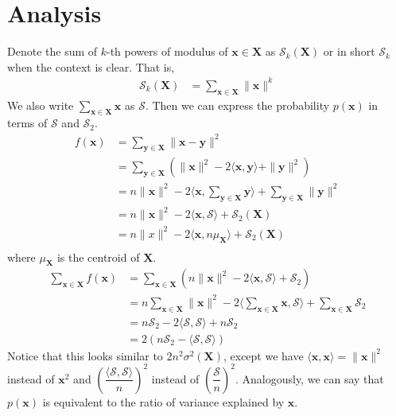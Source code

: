 \documentclass[twoside, 11pt]{article}
\newcommand{\x}{\mathbf{x}}
\newcommand{\X}{\mathbf{X}}
\newcommand{\y}{\mathbf{y}}
\renewcommand{\S}{\mathcal{S}}
\begin{document}
	\section{Analysis}
	Denote the sum of $k$-th powers of modulus of $\x\in\X$ as $\S_k(\X)$ or in short $\S_k$ when the context is clear. That is,
		\begin{align*}
			\S_k(\X) & = \sum_{\x\in\X}\|\x\|^k
		\end{align*}
	We also write $\sum_{\x\in\X}\x$ as $\S$. Then we can express the probability $p(\x)$ in terms of $\S$ and $\S_2$.
		\begin{align*}
			f(\x)	& = \sum_{\y\in\X}\|\x-\y\|^2\\
					& = \sum_{\y\in\X}\left(\|\x\|^2-2\langle\x,\y\rangle+\|\y\|^2\right)\\
					& = n\|\x\|^2-2\langle\x,\sum_{\y\in\X}\y\rangle+\sum_{\y\in\X}\|\y\|^2\\
					& = n\|\x\|^2-2\langle\x,\S\rangle+\S_2(\X)\\
					& = n\|x\|^2-2\langle\x,n\mu_{\X}\rangle+\S_2(\X)\\
		\end{align*}
	where $\mu_{\X}$ is the centroid of $\X$.
		\begin{align*}
			\sum_{\x\in\X}f(\x)
					& = \sum_{\x\in\X}\left(n\|\x\|^2-2\langle\x,\S\rangle+\S_2\right)\\
					& = n\sum_{\x\in\X}\|\x\|^2-2\langle\sum_{\x\in\X}\x,\S\rangle+\sum_{\x\in\X}\S_2\\
					& = n\S_2-2\langle\S,\S\rangle+n\S_2\\
					& = 2(n\S_2-\langle\S,\S\rangle)
		\end{align*}
	Notice that this looks similar to $2n^2\sigma^2(\X)$, except we have $\langle \x,\x\rangle=\|\x\|^2$ instead of $\x^2$ and $\left(\dfrac{\langle\S,\S\rangle}{n}\right)^2$ instead of $\left(\dfrac{\S}{n}\right)^2$. Analogously, we can say that $p(\x)$ is equivalent to the ratio of variance explained by $\x$.
	
\end{document}
